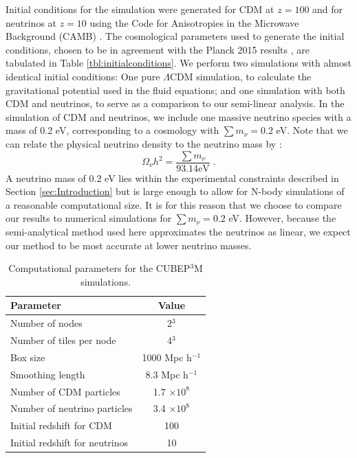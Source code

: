 \documentclass[twocolumn,superscriptaddress,prd]{revtex4}
\begin{document}
Initial conditions for the simulation were generated for CDM 
at $z=100$ and for neutrinos at $z=10$ using the Code for
Anisotropies in the Microwave Background (CAMB) \cite{lewis99,lewis13}. The cosmological parameters used to generate the initial
conditions, chosen to be in agreement with the Planck 2015 results \cite{planck15}, are tabulated in Table
\ref{tbl:initialconditions}.  
We perform two simulations with almost identical
initial conditions: One pure $\Lambda$CDM simulation, to calculate
the gravitational potential used in the fluid equations; and one
simulation with both CDM and neutrinos, to serve as a
comparison to our semi-linear analysis.  In the simulation of CDM
 and neutrinos, we include one massive neutrino
species with a mass of 0.2 eV, corresponding to a cosmology with $\sum
m_\nu = 0.2$ eV.  
Note that we can relate
the physical neutrino density to the neutrino mass by
\cite{Mangano05}:
\begin{equation}
  \Omega_\nu h^2 = \frac{ \sum m_\nu }{ 93.14 \text{eV}} \;.
\end{equation}
A neutrino mass of 0.2 eV lies within the experimental constraints described in
Section \ref{sec:Introduction} but is large enough to allow for N-body
simulations of a reasonable computational size.  It is for this
reason that we choose to compare our results to numerical simulations for $\sum m_\nu =
0.2$ eV. However, because the semi-analytical method used here approximates the
neutrinos as linear, we expect our method to be most
accurate at lower neutrino masses.   

\begin{table}[h]
\caption{Computational parameters for the CUBEP$^{3}$M simulations. }\label{tbl:initialnconditions}
\begin{center}
\begin{tabular}{lc}
\toprule
Parameter & Value \\ \hline \hline
  Number of nodes & 2$^3$ \\
 Number of tiles per node & 4$^3$ \\
Box size & 1000 Mpc h$^{-1}$ \\
Smoothing length & 8.3 Mpc h$^{-1}$ \\
Number of CDM particles & 1.7 $\times 10^{8}$\\
Number of neutrino particles & 3.4 $\times 10^{8}$\\
 Initial redshift for CDM & 100 \\
Initial redshift for neutrinos & 10 \\\bottomrule
\end{tabular}
\end{center}
\end{table}
\end{document}

